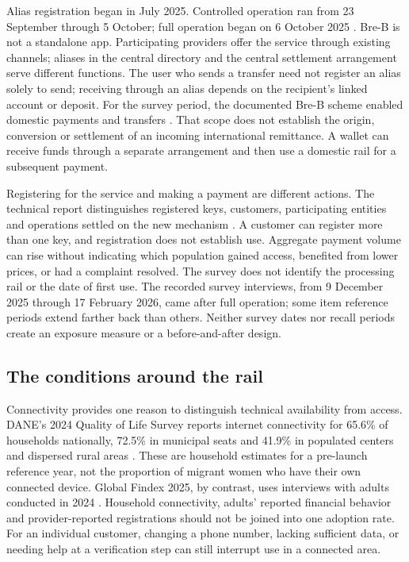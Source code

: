 Alias registration began in July 2025. Controlled operation ran from 23 September through 5 October; full operation began on 6 October 2025 \citep{banreppilot,banreptechnical2026,banrep2026}. Bre-B is not a standalone app. Participating providers offer the service through existing channels; aliases in the central directory and the central settlement arrangement serve different functions. The user who sends a transfer need not register an alias solely to send; receiving through an alias depends on the recipient's linked account or deposit. For the survey period, the documented Bre-B scheme enabled domestic payments and transfers \citep{banrepfaq,banreptechnical2026}. That scope does not establish the origin, conversion or settlement of an incoming international remittance. A wallet can receive funds through a separate arrangement and then use a domestic rail for a subsequent payment.

Registering for the service and making a payment are different actions. The technical report distinguishes registered keys, customers, participating entities and operations settled on the new mechanism \citep{banreptechnical2026}. A customer can register more than one key, and registration does not establish use. Aggregate payment volume can rise without indicating which population gained access, benefited from lower prices, or had a complaint resolved. The survey does not identify the processing rail or the date of first use. The recorded survey interviews, from 9 December 2025 through 17 February 2026, came after full operation; some item reference periods extend farther back than others. Neither survey dates nor recall periods create an exposure measure or a before-and-after design.

\subsection{The conditions around the rail}
Connectivity provides one reason to distinguish technical availability from access. DANE's 2024 Quality of Life Survey reports internet connectivity for 65.6\% of households nationally, 72.5\% in municipal seats and 41.9\% in populated centers and dispersed rural areas \citep{daneentic2025}. These are household estimates for a pre-launch reference year, not the proportion of migrant women who have their own connected device. Global Findex 2025, by contrast, uses interviews with adults conducted in 2024 \citep{findex2025}. Household connectivity, adults' reported financial behavior and provider-reported registrations should not be joined into one adoption rate. For an individual customer, changing a phone number, lacking sufficient data, or needing help at a verification step can still interrupt use in a connected area.


